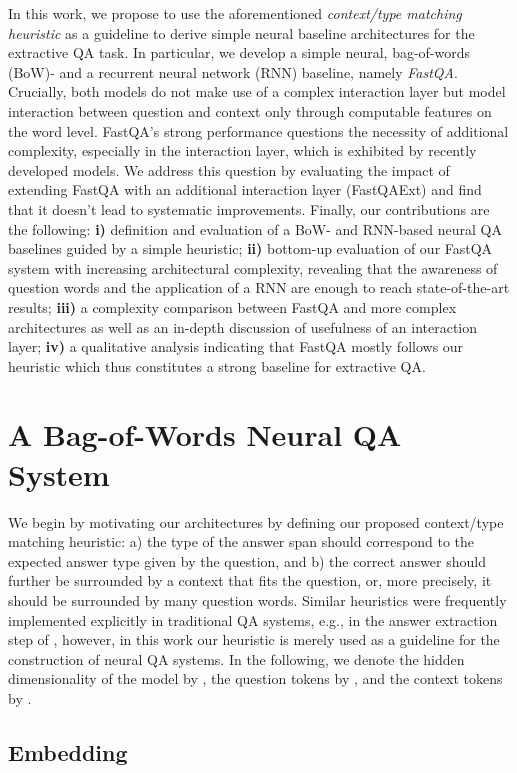 \documentclass[11pt,a4paper]{article}
\begin{document}
In this work, we propose to use the aforementioned \textit{context/type matching heuristic} as a guideline to derive simple neural baseline architectures for the extractive QA task. In particular, we develop a simple neural, bag-of-words (BoW)- and a recurrent neural network (RNN) baseline, namely \textit{FastQA}. Crucially, both models do not make use of a complex interaction layer but model interaction between question and context only through computable features on the word level. FastQA's strong performance questions the necessity of additional complexity, especially in the interaction layer, which is exhibited by recently developed models. We address this question by evaluating the impact of extending FastQA with an additional interaction layer (FastQAExt) and find that it doesn't lead to systematic improvements. Finally, our contributions are the following: \textbf{i)} definition and evaluation of a BoW- and RNN-based neural QA baselines guided by a simple heuristic; \textbf{ii)} bottom-up evaluation of our FastQA system with increasing architectural complexity, revealing that the awareness of question words and the application of a RNN are enough to reach state-of-the-art results; \textbf{iii)} a complexity comparison between FastQA and more complex architectures as well as an in-depth discussion of usefulness of an interaction layer; \textbf{iv)} a qualitative analysis indicating that FastQA mostly follows our heuristic which thus constitutes a strong baseline for extractive QA.


\section{A Bag-of-Words Neural QA System}\label{sec:fast_qa}

We begin by motivating our architectures by defining our proposed context/type matching heuristic: a) the type of the answer span should correspond to the expected answer type given by the question, and b) the correct answer should further be surrounded by a context that fits the question, or, more precisely, it should be surrounded by many question words. Similar heuristics were frequently implemented explicitly in traditional QA systems, e.g., in the answer extraction step of , however, in this work our heuristic is merely used as a guideline for the construction of neural QA systems. In the following, we denote the hidden dimensionality of the model by , the question tokens by , and the context tokens by .

\subsection{Embedding}\label{sec:embedder}
\end{document}
